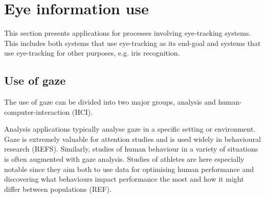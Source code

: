 






\section{Eye information use}
This section presents applications for processes involving eye-tracking systems. This includes both systems that use eye-tracking as its end-goal and systems that use eye-tracking for other purposes, e.g. iris recognition.


\subsection{Use of gaze}
The use of gaze can be divided into two major groups, analysis and human-computer-interaction (HCI). 

Analysis applications typically analyse gaze in a specific setting or environment. Gaze is extremely valuable for attention studies and is used widely in behavioural research (REFS). Similarly, studies of human behaviour in a variety of situations is often augmented with gaze analysis. Studies of athletes are here especially notable since they aim both to use data for optimising human performance and discovering what behaviours impact performance the most and how it might differ between populations (REF).

